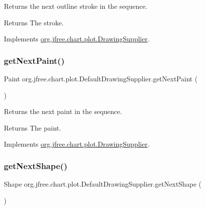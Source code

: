 Returns the next outline stroke in the sequence.

\begin{DoxyReturn}{Returns}
The stroke. 
\end{DoxyReturn}


Implements \mbox{\hyperlink{interfaceorg_1_1jfree_1_1chart_1_1plot_1_1_drawing_supplier_aa105b3b934971ebb5fea78e30d41f2fb}{org.\+jfree.\+chart.\+plot.\+Drawing\+Supplier}}.

\mbox{\label{classorg_1_1jfree_1_1chart_1_1plot_1_1_default_drawing_supplier_a4e1f7e6db7275fbe64dd76b6075556a9}} 
\subsubsection{\texorpdfstring{get\+Next\+Paint()}{getNextPaint()}}
{\footnotesize\ttfamily Paint org.\+jfree.\+chart.\+plot.\+Default\+Drawing\+Supplier.\+get\+Next\+Paint (\begin{DoxyParamCaption}{ }\end{DoxyParamCaption})}

Returns the next paint in the sequence.

\begin{DoxyReturn}{Returns}
The paint. 
\end{DoxyReturn}


Implements \mbox{\hyperlink{interfaceorg_1_1jfree_1_1chart_1_1plot_1_1_drawing_supplier_ad7f6058a6390128ef1e52cddee4f8d0b}{org.\+jfree.\+chart.\+plot.\+Drawing\+Supplier}}.

\mbox{\label{classorg_1_1jfree_1_1chart_1_1plot_1_1_default_drawing_supplier_ada83bbc7e56d31ce1c49da7d51baf313}} 
\subsubsection{\texorpdfstring{get\+Next\+Shape()}{getNextShape()}}
{\footnotesize\ttfamily Shape org.\+jfree.\+chart.\+plot.\+Default\+Drawing\+Supplier.\+get\+Next\+Shape (\begin{DoxyParamCaption}{ }\end{DoxyParamCaption})}

